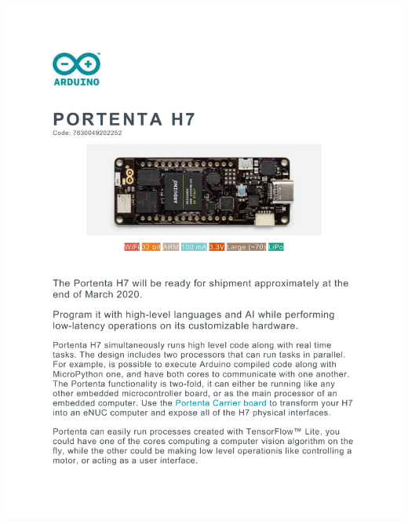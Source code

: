 {
	\includegraphics[width=1\textwidth,page=\themycounter]{../../MLbib/Arduino/PortentaH7/Portenta_H7_Web.pdf}
	\newpage
}



